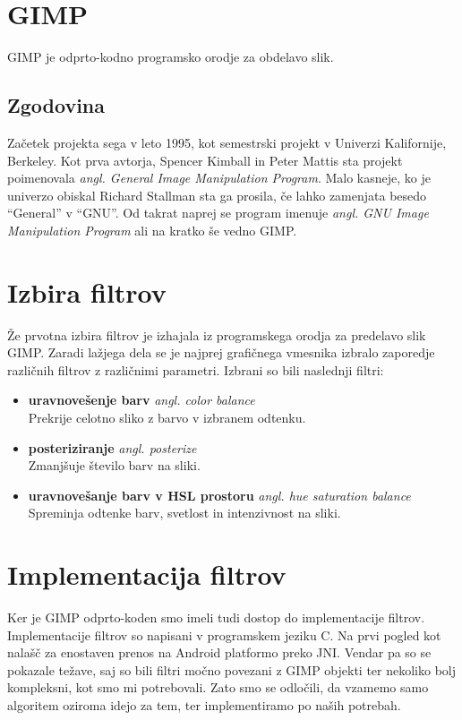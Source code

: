 \section{GIMP}
GIMP je odprto-kodno programsko orodje za obdelavo slik.

\subsection{Zgodovina}
Začetek projekta sega v leto 1995, kot semestrski projekt v Univerzi Kalifornije, Berkeley. Kot prva avtorja, Spencer Kimball in Peter Mattis sta projekt poimenovala \textit{angl. General Image Manipulation Program}. Malo kasneje, ko je univerzo obiskal Richard Stallman sta ga prosila, če lahko zamenjata besedo ``General'' v ``GNU''. Od takrat naprej se program imenuje \textit{angl. GNU Image Manipulation Program} ali na kratko še vedno GIMP.

\section{Izbira filtrov}
Že prvotna izbira filtrov je izhajala iz programskega orodja za predelavo slik GIMP. Zaradi lažjega dela se je najprej grafičnega vmesnika izbralo zaporedje različnih filtrov z različnimi parametri. Izbrani so bili naslednji filtri:
\begin{itemize}
	\item \textbf{uravnovešenje barv} \textit{angl. color balance} \hfill \\ Prekrije celotno sliko z barvo v izbranem odtenku.
	\item \textbf{posteriziranje} \textit{angl. posterize} \hfill \\ Zmanjšuje število barv na sliki.
	\item \textbf{uravnovešanje barv v HSL prostoru} \textit{angl. hue saturation balance} \hfill \\ Spreminja odtenke barv, svetlost in intenzivnost na sliki.%
\end{itemize}

\section{Implementacija filtrov}
Ker je GIMP odprto-koden smo imeli tudi dostop do implementacije filtrov. Implementacije filtrov so napisani v programskem jeziku C. Na prvi pogled kot nalašč za enostaven prenos na Android platformo preko JNI. Vendar pa so se pokazale težave, saj so bili filtri močno povezani z GIMP objekti ter nekoliko bolj kompleksni, kot smo mi potrebovali. Zato smo se odločili, da vzamemo samo algoritem oziroma idejo za tem, ter implementiramo po naših potrebah. 



